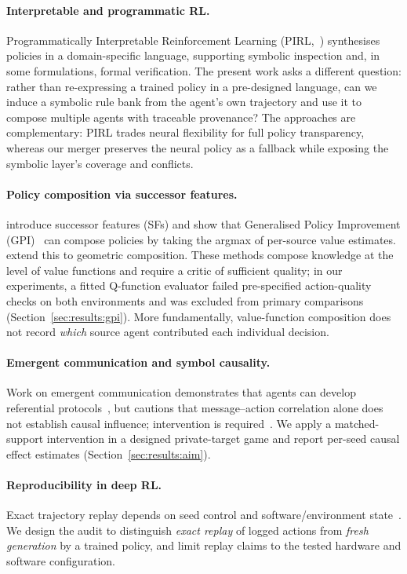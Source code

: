 \documentclass[12pt]{article}
\begin{document}
\paragraph{Interpretable and programmatic RL.}
Programmatically Interpretable Reinforcement Learning
(PIRL,~\citet{verma2018pirl}) synthesises policies in a domain-specific
language, supporting symbolic inspection and, in some formulations, formal
verification.
The present work asks a different question: rather than re-expressing a
trained policy in a pre-designed language, can we induce a symbolic rule
bank from the agent's own trajectory and use it to compose multiple agents
with traceable provenance?
The approaches are complementary: PIRL trades neural flexibility for
full policy transparency, whereas our merger preserves the neural policy
as a fallback while exposing the symbolic layer's coverage and conflicts.

\paragraph{Policy composition via successor features.}
\citet{barreto2017successor} introduce successor features (SFs) and show
that Generalised Policy Improvement (GPI)~\citep{barreto2017gpi} can
compose policies by taking the argmax of per-source value estimates.
\citet{thakoor2022geometric} extend this to geometric composition.
These methods compose knowledge at the level of value functions and require
a critic of sufficient quality; in our experiments, a fitted
Q-function evaluator failed pre-specified action-quality checks on both
environments and was excluded from primary comparisons
(Section~\ref{sec:results:gpi}).
More fundamentally, value-function composition does not record \emph{which}
source agent contributed each individual decision.

\paragraph{Emergent communication and symbol causality.}
Work on emergent communication demonstrates that agents can develop
referential protocols~\citep{lazaridou2018emergent}, but cautions that
message--action correlation alone does not establish causal influence;
intervention is required~\citep{lowe2019pitfalls}.
We apply a matched-support intervention in a designed private-target
game and report per-seed causal effect estimates
(Section~\ref{sec:results:aim}).

\paragraph{Reproducibility in deep RL.}
Exact trajectory replay depends on seed control and
software/environment state~\citep{nagarajan2018deterministic}.
We design the audit to distinguish \emph{exact replay} of logged actions
from \emph{fresh generation} by a trained policy,
and limit replay claims to the tested hardware and software configuration.
\end{document}
